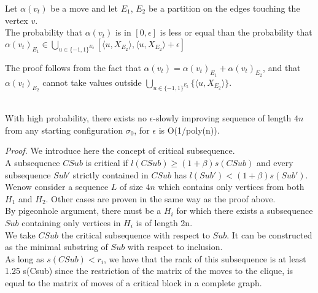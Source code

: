 \begin{lemma}
\label{lem::partition}
Let $\alpha(v_t)$ be a move and let $E_1$, $E_2$ be a partition on the edges touching the vertex $v$. \\
The probability that $\alpha(v_t)$ is in $[0, \epsilon]$ is less or equal than the probability that $\alpha(v_t)_{E_1} \in \bigcup_{u \in \{-1, 1 \}^{E_2}} [\langle u, X_{E_2}\rangle , \langle u, X_{E_2}\rangle + \epsilon]$
\end{lemma}

The proof follows from the fact that $\alpha(v_t) = \alpha(v_t)_{E_1} + \alpha(v_t)_{E_2}$, and that $\alpha(v_t)_{E_2}$ cannot take values outside $\bigcup_{u \in \{-1, 1 \}^{E_2}}\{\langle u, X_{E_2}\rangle\}$.\\

\begin{proposition}
\leavevmode \\
With high probability, there exists no $\epsilon$-slowly improving sequence of length $4n$ from any starting configuration $\sigma_0$, for $\epsilon$ is O(1/poly(n)).
\end{proposition}

\textit{Proof. }
We introduce here the concept of critical subsequence. \\
A subsequence $CSub$ is critical if $l(CSub) \geq (1 + \beta)s(CSub)$ and every subsequence $Sub'$ strictly contained in $CSub$ has $l(Sub') < (1+\beta)s(Sub')$. \\
 Wenow consider a sequence $L$ of size $4n$ which contains only vertices from both $H_1$ and $H_2$. 
Other cases are proven in the same way as the proof above. \\
By pigeonhole argument, there must be a $H_i$ for which there exists a subsequence $Sub$ containing only vertices in $H_i$ is of length 2n. \\
We take $CSub$ the critical subsequence with respect to $Sub$. It can be constructed as the minimal substring of $Sub$ with respect to inclusion.\\
As long as $s(CSub) < r_i$, we have that the rank of this subsequence is at least 1.25 s(Csub) since the restriction of the matrix of the moves to the clique, is equal to the matrix of moves of a critical block in a complete graph.\\
